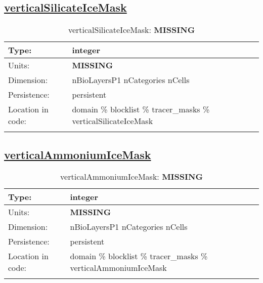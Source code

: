 \subsection[verticalSilicateIceMask]{\hyperref[sec:var_tab_tracer_masks]{verticalSilicateIceMask}}
\label{subsec:var_sec_tracer_masks_verticalSilicateIceMask}
\begin{center}
\begin{longtable}{| p{2.0in} | p{4.0in} |}
        \hline 
        Type: & integer \\
        \hline 
        Units: & {\bf \color{red} MISSING} \\
        \hline 
        Dimension: & nBioLayersP1 nCategories nCells \\
        \hline 
        Persistence: & persistent \\
        \hline 
         Location in code: & domain \% blocklist \% tracer\_masks \% verticalSilicateIceMask \\
         \hline 
    \caption{verticalSilicateIceMask: {\bf \color{red} MISSING}}
\end{longtable}
\end{center}
\subsection[verticalAmmoniumIceMask]{\hyperref[sec:var_tab_tracer_masks]{verticalAmmoniumIceMask}}
\label{subsec:var_sec_tracer_masks_verticalAmmoniumIceMask}
\begin{center}
\begin{longtable}{| p{2.0in} | p{4.0in} |}
        \hline 
        Type: & integer \\
        \hline 
        Units: & {\bf \color{red} MISSING} \\
        \hline 
        Dimension: & nBioLayersP1 nCategories nCells \\
        \hline 
        Persistence: & persistent \\
        \hline 
         Location in code: & domain \% blocklist \% tracer\_masks \% verticalAmmoniumIceMask \\
         \hline 
    \caption{verticalAmmoniumIceMask: {\bf \color{red} MISSING}}
\end{longtable}
\end{center}
